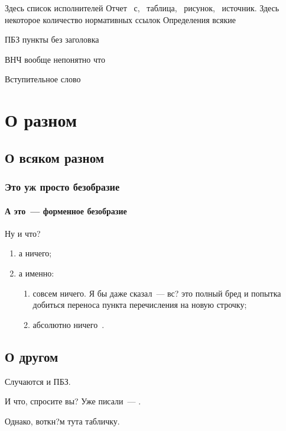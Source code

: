 \documentclass[koi8-r,usehyperref]{G7-32}
\begin{document}
\frontmatter
 \Executors Здесь список исполнителей
 \Referat
 Отчет \totalpages~с, \totaltables~таблица, \totalfigures~рисунок, \totalbibs~источник.
 \tableofcontents
 \NormRefs Здесь некоторое количество нормативных ссылок
 \Defines Определения всякие
 \Abbreviations
 \begin{abbreviation}
  \item[ПБЗ] пункты без заголовка
  \item[ВНЧ] вообще непонятно что
 \end{abbreviation}

 \Introduction Вступительное слово
\mainmatter

\chapter{О разном}
\ttl
\section{О всяком разном}
\ttl
\subsection{Это уж просто безобразие}
\ttl
\subsubsection{А это~--- форменное безобразие}\label{L1}
Ну и что?
\begin{enumerate}
 \item\label{L1:I1}
  а ничего;
 \item
  а именно:
  \begin{enumerate}
   \item
    совсем ничего. Я бы даже сказал~--- вс? это полный бред
    и попытка добиться переноса пункта перечисления на новую строчку;
   \item
    абсолютно ничего~\cite{bib:test1}.
  \end{enumerate}
\end{enumerate}

\section{О другом}
\nsubsection Случаются и ПБЗ.

И что, спросите вы? Уже писали~--- .

Однако, воткн?м тута табличку.
\end{document}
